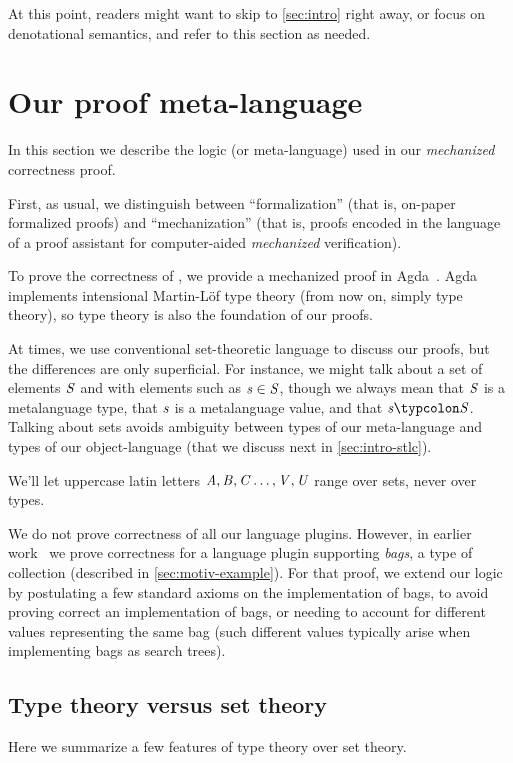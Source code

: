 At this point, readers might want to skip to \cref{sec:intro}
right away, or focus on denotational semantics, and refer to this
section as needed.

\section{Our proof meta-language}
\label{sec:metalanguage}
In this section we describe the logic (or meta-language) used in our
\emph{mechanized} correctness proof.

First, as usual, we distinguish between ``formalization'' (that
is, on-paper formalized proofs) and ``mechanization'' (that is,
proofs encoded in the language of a proof assistant for
computer-aided \emph{mechanized} verification).

To prove the correctness of \ILC, we provide a mechanized proof
in Agda~\citep{agda-head}. Agda implements intensional Martin-Löf
type theory (from now on, simply type theory), so type theory is
also the foundation of our proofs.

At times, we use conventional set-theoretic language to discuss
our proofs, but the differences are only superficial. For
instance, we might talk about a set of elements \ensuremath{\Conid{S}} and with
elements such as \ensuremath{\Varid{s}\in \Conid{S}}, though we always mean that \ensuremath{\Conid{S}} is
a metalanguage type, that \ensuremath{\Varid{s}} is a metalanguage value, and that \ensuremath{\Varid{s}\typcolon\Conid{S}}.
Talking about sets
avoids ambiguity between types of our meta-language and types of
our object-language (that we discuss next in
\cref{sec:intro-stlc}).
\begin{notation}
  We'll let uppercase latin letters \ensuremath{\Conid{A},\Conid{B},\Conid{C}\ldots,\Conid{V},\Conid{U}} range
  over sets, never over types.
\end{notation}

We do not prove correctness of all our language plugins. However,
in earlier work~\citep{CaiEtAl2014ILC} we prove correctness for
a language plugin supporting \emph{bags}, a type of collection (described in
\cref{sec:motiv-example}). For that proof, we extend our logic by
postulating a few standard axioms on the implementation of bags,
to avoid proving correct an implementation of bags, or needing to
account for different values representing the same bag (such
different values typically arise when implementing bags as search
trees).

\subsection{Type theory versus set theory}
Here we summarize a few features of type theory over set theory.

